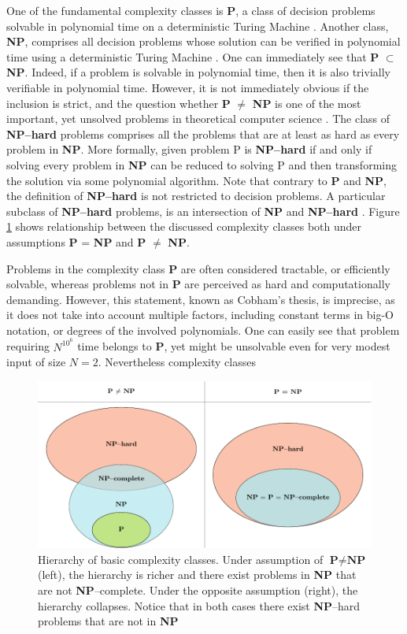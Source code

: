 One of the fundamental complexity classes is \textbf{P}, a class of decision problems solvable in polynomial time on a deterministic Turing Machine  \cite{arora}. Another class, \textbf{NP}, comprises all decision problems whose solution can be verified in polynomial time using a deterministic Turing Machine \cite{arora}.
One can immediately see that \textbf{P} $\subset$ \textbf{NP}. Indeed, if a problem is solvable in polynomial time, then it is also trivially verifiable in polynomial time. However, it is not immediately obvious if the inclusion is strict, and the question whether \textbf{P} $\ne$ \textbf{NP} is one of the most important, yet unsolved problems in theoretical computer science \cite{fortnow}.
The class of \textbf{NP--hard} problems comprises all the problems that are at least as hard as every problem in \textbf{NP}. More formally, given problem P is \textbf{NP--hard} if and only if solving every problem in \textbf{NP} can be reduced to solving P and then transforming the solution via some polynomial algorithm. Note that contrary to \textbf{P} and \textbf{NP},  the definition of \textbf{NP--hard} is not restricted to decision problems. A particular subclass of \textbf{NP--hard} problems, is an intersection of \textbf{NP} and \textbf{NP--hard} \cite{arora}. Figure \ref{fig:complexity} shows relationship between the discussed complexity classes both under assumptions \textbf{P} = \textbf{NP} and \textbf{P} $\ne$ \textbf{NP}.

Problems in the complexity class \textbf{P} are often considered tractable, or efficiently solvable, whereas problems not in \textbf{P} are perceived as hard and computationally demanding. However, this statement, known as Cobham's thesis, is imprecise, as it does not take into account multiple factors, including constant terms in big-O notation, or degrees of the involved polynomials. One can easily see that problem requiring $N^{10^6}$ time belongs to \textbf{P}, yet might be unsolvable even for very modest input of size $N=2$. Nevertheless complexity classes

\begin{figure}
    \includegraphics[width=\textwidth]{figures/complexity_new.pdf}
    \caption{Hierarchy of basic complexity classes. Under assumption of $\textbf{P} \ne \textbf{NP}$ (left), the hierarchy is richer and there exist problems in \textbf{NP}  that are not \textbf{NP}--complete. Under the opposite assumption (right), the hierarchy collapses. Notice that in both cases there exist \textbf{NP}--hard problems that are not in \textbf{NP}
    }
    \label{fig:complexity}
\end{figure}


